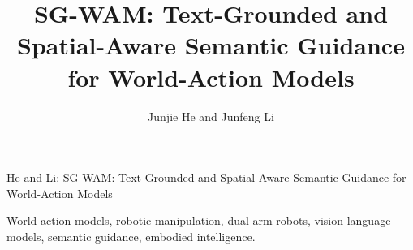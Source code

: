 \documentclass[journal]{IEEEtran}
\begin{document}

\title{SG-WAM: Text-Grounded and Spatial-Aware Semantic Guidance for World-Action Models}

\author{Junjie He and Junfeng Li}

%
{He and Li: SG-WAM: Text-Grounded and Spatial-Aware Semantic Guidance for World-Action Models}

\maketitle



\begin{IEEEkeywords}
World-action models, robotic manipulation, dual-arm robots, vision-language models, semantic guidance, embodied intelligence.
\end{IEEEkeywords}









\end{document}
